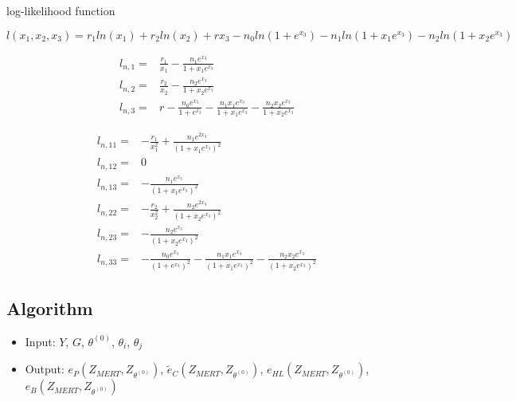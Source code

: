 \documentclass{article}
\begin{document}
log-likelihood function

$l(x_1,x_2,x_3)= r_1ln(x_1)+r_2ln(x_2)+rx_3- n_0ln(1+e^{x_3})-n_1ln(1+x_1e^{x_3})-n_2 ln(1+x_2e^{x_3})$

\begin{align*}
l_{n,1} = & \frac{r_1}{x_1} - \frac{n_1e^{x_3}}{1+x_1e^{x_3}}\\
l_{n,2} = & \frac{r_2}{x_2} - \frac{n_2e^{x_3}}{1+x_2e^{x_3}}\\
l_{n,3} = & r - \frac{n_0e^{x_3}}{1+e^{x_3}}-\frac{n_1x_1e^{x_3}}{1+x_1 e^{x_3}}- \frac{n_2x_2e^{x_3}}{1+x_2e^{x_3}}
\end{align*}

\begin{align*}
l_{n,11} = & - \frac{r_1}{x_1^2} + \frac{n_1e^{2x_3}}{(1+x_1e^{x_3})^2}\\
l_{n,12} = &0\\
l_{n,13} = & - \frac{n_1e^{x_3}}{(1+x_1e^{x_3})^2}\\
l_{n,22} = & - \frac{r_2}{x_2^2} + \frac{n_2e^{2x_3}}{(1+x_2e^{x_3})^2}\\
l_{n,23} = & - \frac{n_2e^{x_3}}{(1+x_2e^{x_3})^2}\\
l_{n,33} = & - \frac{n_0e^{x_3}}{(1+e^{x_3})^2}-\frac{n_1x_1e^{x_3}}{(1+x_1e^{x_3})^2}- \frac{n_2x_2e^{x_3}}{(1+x_2e^{x_3})^2}
\end{align*}


\subsection{Algorithm}
\begin{itemize}
\item Input: $Y$, $G$, $\theta^{(0)}$, $\theta_i$, $\theta_j$
\item Output: $e_P(Z_{MERT},Z_{\theta^{(0)}})$, $\tilde{e}_C(Z_{MERT},Z_{\theta^{(0)}})$, $e_{HL}(Z_{MERT},Z_{\theta^{(0)}})$, $e_{B}(Z_{MERT},Z_{\theta^{(0)}})$
\end{itemize}
\end{document}
